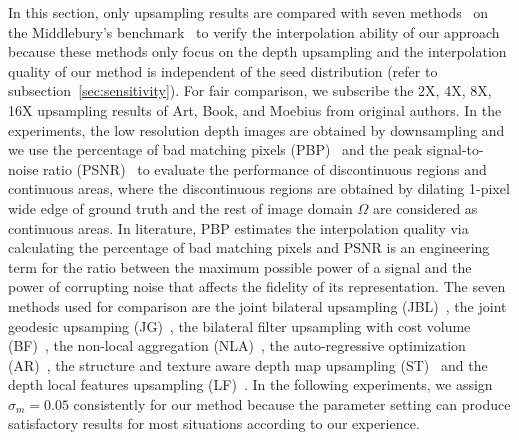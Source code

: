 \documentclass[preprint,10pt,5p,times,twocolumn]{elsarticle}
\begin{document}
In this section, only upsampling results are compared with seven methods~\cite{Liu2013,Yang2012,YangJingyu2012, Kopf2007,YangQingxiong2007,Choi_TIP_2014,Kang_ET_2014} on the Middlebury's benchmark~\cite{Hirschmuller2007} to verify the interpolation ability of our approach because these methods only focus on the depth upsampling and the interpolation quality of our method is independent of the seed distribution (refer to subsection~\ref{sec:sensitivity}). For fair comparison, we subscribe the 2X, 4X, 8X, 16X upsampling results of Art, Book, and Moebius from original authors. In the experiments, the low resolution depth images are obtained by downsampling and we use the percentage of bad matching pixels (PBP)~\cite{Scharstein2002} and the peak signal-to-noise ratio (PSNR)~\cite{Huynh_EL_2008} to evaluate the performance of discontinuous regions and continuous areas, where the discontinuous regions are obtained by dilating 1-pixel wide edge of ground truth and the rest of image domain $\Omega$ are considered as continuous areas. In literature, PBP estimates the interpolation quality via calculating the percentage of bad matching pixels and PSNR is an engineering term for the ratio between the maximum possible power of a signal and the power of corrupting noise that affects the fidelity of its representation.
The seven methods used for comparison are the joint bilateral upsampling (JBL)~\cite{Kopf2007}, the joint geodesic upsamping (JG)~\cite{Liu2013}, the bilateral filter upsampling with cost volume (BF)~\cite{YangQingxiong2007}, the non-local aggregation (NLA)~\cite{Yang2012}, the auto-regressive optimization (AR)~\cite{YangJingyu2012}, the structure and texture aware depth map upsampling (ST)~\cite{Choi_TIP_2014} and the depth local features upsampling (LF)~\cite{Kang_ET_2014}. In the following experiments, we assign $\sigma_m = 0.05$ consistently for our method because the parameter setting can produce satisfactory results for most situations according to our experience.
\end{document}

